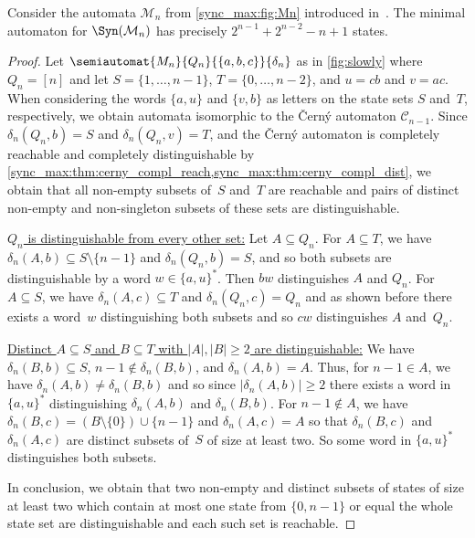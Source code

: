 \begin{theorem} \label{syn_max:thm:Mn}
    Consider the automata $\mathcal M_n$ from \cref{sync_max:fig:Mn} introduced in~\cite{KisielewiczS15}.
	The minimal automaton for $\Syn(\mathcal M_n)$ has precisely $2^{n-1} + 2^{n-2} - n + 1$ states.
\end{theorem}
\begin{proof} 
	Let $\semiautomat{M_n}{Q_n}{\{a,b,c\}}{\delta_n}$
	as in \cref{fig:slowly} where $Q_n = [n]$
	and let $S = \{1,\ldots,n-1\}$,
	$T = \{0,\ldots,n-2\}$,
	and $u = cb$ and $v = ac$. 
	When considering the words $\{a, u\}$
	and $\{v, b\}$ as letters on the state sets $S$
	and~$T$, respectively, we obtain
	automata isomorphic to the \v{C}ern\'y automaton $\mathcal C_{n-1}$.
	Since $\delta_n(Q_n, b) = S$
	and $\delta_n(Q_n, v) = T$, and
	the \v{C}ern\'y automaton
	is completely reachable and completely distinguishable 
	by \cref{sync_max:thm:cerny_compl_reach,sync_max:thm:cerny_compl_dist},
	we obtain that all non-empty subsets
	of~$S$ and~$T$ are reachable
	and pairs of distinct non-empty and non-singleton
	subsets of these sets are distinguishable.
		
	\underline{$Q_n$ is distinguishable from every other set:} Let $A \subseteq Q_n$.
	For $A \subseteq T$, 
	we have $\delta_n(A, b) \subseteq S \setminus \{n-1\}$
	and $\delta_n(Q_n, b) = S$,
	and so both subsets are distinguishable by a word $w \in \{a, u\}^*$.
	Then $bw$ distinguishes $A$ and $Q_n$.
	For $A \subseteq S$, we have $\delta_n(A, c) \subseteq T$
	and $\delta_n(Q_n, c) = Q_n$
	and as shown before there exists a word~$w$ distinguishing both
	subsets and so $cw$ distinguishes $A$
	and~$Q_n$.	
	
	\underline{Distinct $A \subseteq S$	and $B \subseteq T$ with $|A|, |B| \ge 2$ are distinguishable:}
	We have $\delta_n(B, b) \subseteq S$, $n - 1 \notin \delta_n(B, b)$,
	and $\delta_n(A, b) = A$.
	Thus, for $n - 1 \in A$,
    we have $\delta_n(A, b) \ne \delta_n(B, b)$
    and so since $|\delta_n(A,b)| \ge 2$ there exists a word in $\{a, u\}^*$
    distinguishing  $\delta_n(A, b)$ and $\delta_n(B, b)$.
    For $n - 1 \notin A$,
    we have $\delta_n(B, c) = ( B \setminus \{0\} ) \cup \{n - 1\}$
    and $\delta_n(A, c) = A$
    so that $\delta_n(B, c)$ and $\delta_n(A, c)$
    are distinct subsets of~$S$
    of size at least two.
    So some word in $\{a, u\}^*$
    distinguishes both subsets.
    
    In conclusion, we obtain that two non-empty and distinct subsets of states
	of size at least two which contain
	at most one state from $\{0,n-1\}$ or equal the whole state set
	are distinguishable and each such set is reachable.
		

\end{proof}
